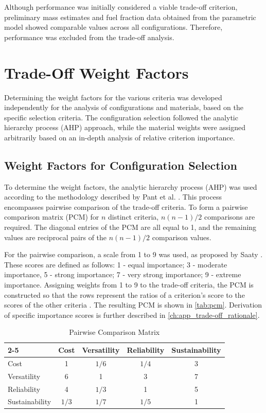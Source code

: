 Although performance was initially considered a viable trade-off criterion, preliminary mass estimates and fuel fraction data obtained from the parametric model showed comparable values across all configurations. Therefore, performance was excluded from the trade-off analysis.

\section{Trade-Off Weight Factors}
\label{sec:trade-off_weight_factors}
Determining the weight factors for the various criteria was developed independently for the analysis of configurations and materials, based on the specific selection criteria. The configuration selection followed the analytic hierarchy process (AHP) approach, while the material weights were assigned arbitrarily based on an in-depth analysis of relative criterion importance.

\subsection{Weight Factors for Configuration Selection}
\label{subsec:weight_factors_configurations}

To determine the weight factors, the analytic hierarchy process (AHP) was used according to the methodology described by Pant et al. \cite{Pant2022}. This process encompasses pairwise comparison of the trade-off criteria. To form a pairwise comparison matrix (PCM) for $n$ distinct criteria, $n(n-1)/2$ comparisons are required. The diagonal entries of the PCM are all equal to 1, and the remaining values are reciprocal pairs of the $n(n-1)/2$ comparison values.

For the pairwise comparison, a scale from 1 to 9 was used, as proposed by Saaty \cite{SAATY19909}. These scores are defined as follows: 1 - equal importance; 3 - moderate importance, 5 - strong importance; 7 - very strong importance; 9 - extreme importance.  Assigning weights from 1 to 9 to the trade-off criteria, the PCM is constructed so that the rows represent the ratios of a criterion's score to the scores of the other criteria \cite{SAATY19909}. The resulting PCM is shown in \autoref{tab:pcm}. Derivation of specific importance scores is further described in \autoref{ch:app_trade-off_rationale}.


\begin{table}[h!]
\centering
\caption{Pairwise Comparison Matrix}
\renewcommand{\arraystretch}{1.2}
\begin{tabular}{|l ||c| c| c| c|}
\cline{2-5}
\multicolumn{1}{r||}{} 
 & Cost & Versatility & Reliability & Sustainability \\
\hline\hline
Cost           & 1 & $1/6$ & $1/4$ & 3  \\\hline
Versatility    & 6 & 1 & 3 & 7 \\\hline
Reliability    & 4 & $1/3$ & 1 & 5 \\\hline
Sustainability & $1/3$ & $1/7$ & $1/5$ & 1 \\\hline
\end{tabular}
\label{tab:pcm}
\end{table}

